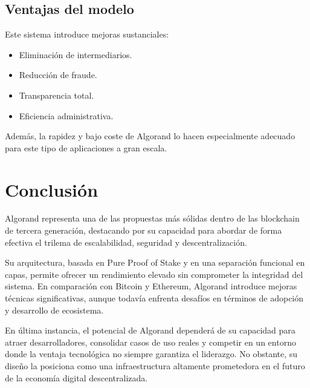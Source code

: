 \documentclass[12pt]{article}
\begin{document}
\subsection{Ventajas del modelo}

Este sistema introduce mejoras sustanciales:
\begin{itemize}
    \item Eliminación de intermediarios.
    \item Reducción de fraude.
    \item Transparencia total.
    \item Eficiencia administrativa.
\end{itemize}

Además, la rapidez y bajo coste de Algorand lo hacen especialmente adecuado para este tipo de aplicaciones a gran escala.

\section*{Conclusión}

Algorand representa una de las propuestas más sólidas dentro de las blockchain de tercera generación, destacando por su capacidad para abordar de forma efectiva el trilema de escalabilidad, seguridad y descentralización.

Su arquitectura, basada en Pure Proof of Stake y en una separación funcional en capas, permite ofrecer un rendimiento elevado sin comprometer la integridad del sistema. En comparación con Bitcoin y Ethereum, Algorand introduce mejoras técnicas significativas, aunque todavía enfrenta desafíos en términos de adopción y desarrollo de ecosistema.

En última instancia, el potencial de Algorand dependerá de su capacidad para atraer desarrolladores, consolidar casos de uso reales y competir en un entorno donde la ventaja tecnológica no siempre garantiza el liderazgo. No obstante, su diseño la posiciona como una infraestructura altamente prometedora en el futuro de la economía digital descentralizada.
\end{document}
